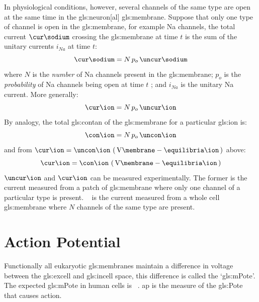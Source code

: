 \documentclass[class={.NoTouch/myProject}, crop=false]{standalone}
\begin{document}
In physiological conditions, however,  several channels of the same type are open at the same time in the \gls{gls:neuron}[al] \gls{gls:membrane}. Suppose that only one type of channel is open in the \gls{gls:membrane}, for example \gls{Na} channels, the total current \(\unit{\cur\sodium}\) crossing the \gls{gls:membrane} at time \(t\) is the sum of the unitary currents \(i_{Na}\) at time \(t\):
\begin{equation}
    \unit{\cur\sodium} = N \, p_o \, \unit{\uncur\sodium}
\end{equation}
where \(N\) is the \emph{number} of \gls{Na} channels present in the \gls{gls:membrane}; \(p_o\) is the \emph{probability} of \gls{Na} channels being open at time \(t\)
; and \(i_{Na}\) is the unitary \gls{Na} current.  \newline
More generally:
\begin{equation}
    \unit{\cur\ion} = N \, p_o \, \unit{\uncur\ion}
\end{equation}
By analogy, the total \gls{gls:contan} of the \gls{gls:membrane} for a particular \gls{gls:ion} is: 
\begin{equation}
    \unit{\con\ion} = N \, p_o \, \unit{\uncon\ion}
\end{equation}
and from \(\unit{\cur\ion}= \unit{\uncon\ion} \, \br{\unit{\V\membrane} - \unit{\equilibria\ion}}\) above: 
\begin{equation}\label{eq:ionCurrent}
    \unit{\cur\ion} = \unit{\con\ion} \, \br{\unit{\V\membrane} - \unit{\equilibria\ion}}
\end{equation}
\(\unit{\uncur\ion}\) and \(\unit{\cur\ion}\) can be measured experimentally. The former is the current measured from a patch of \gls{gls:membrane} where only one channel of a particular type is present. \unit{\cur\ion} is the current measured from a whole cell \gls{gls:membrane} where \(N\) channels of the same type are present. 
 
\section{Action Potential}

Functionally all eukaryotic \glspl{gls:membrane} maintain a difference in voltage between the \gls{gls:excell} and \gls{gls:incell} space, this difference is called the `\gls{gls:mPote}'. The expected \gls{gls:mPote} in human cells is ~\cite{}.
\gls{ap} is the measure of the \gls{gls:Pote} that causes action.
\end{document}
